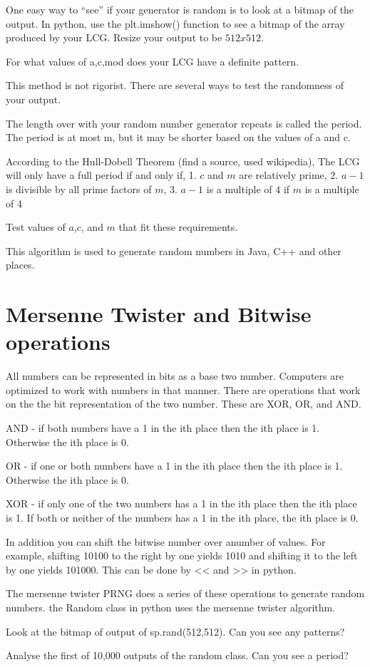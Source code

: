 One easy way to ``see'' if your generator is random is to look at a bitmap of the output. In python, use the plt.imshow() function to see a bitmap of the array produced by your LCG. Resize your output to be $512 x 512$. 

\begin{problem}
For what values of a,c,mod does your LCG have a definite pattern.
\end{problem}

This method is not rigorist. There are several ways to test the randomness of your output. 

The length over with your random number generator repeats is called the period. The period is at most m, but it may be shorter based on the values of a and c.
 
According to the Hull-Dobell Theorem (find a source, used wikipedia), The LCG will only have a full period if and only if, 
1. $c$ and $m$ are relatively prime,
2. $a-1$ is divisible by all prime factors of $m$,
3. $a-1$ is a multiple of 4 if $m$ is a multiple of 4

\begin{problem}
Test values of $a$,$c$, and $m$ that fit these requirements. 
\end{problem}

This algorithm is used to generate random numbers in Java, C++ and other places.

\section*{Mersenne Twister and Bitwise operations}


All numbers can be represented in bits as a base two number. Computers are optimized to work with numbers in that manner. There are operations that work on the the bit representation of the two number. These are XOR, OR, and AND. 

AND - if both numbers have a 1 in the ith place then the ith place is 1. Otherwise the ith place is 0.

OR - if one or both numbers have a 1 in the ith place then the ith place is 1. Otherwise the ith place is 0.

XOR - if only one of the two numbers has a 1 in the ith place then the ith place is 1. If both or neither of the numbers has a 1 in the ith place, the ith place is 0.

In addition you can shift the bitwise number over anumber of values. For example, shifting 10100 to the right by one yields 1010 and shifting it to the left by one yields 101000. This can be done by << and >> in python. 


The mersenne twister PRNG does a series of these operations to generate random numbers. the Random class in python uses the mersenne twister algorithm. 

\begin{problem}
Look at the bitmap of output of sp.rand(512,512). Can you see any patterns?
\end{problem}

\begin{problem}
Analyse the first of 10,000 outputs of the random class. Can you see a period?
\end{problem}
